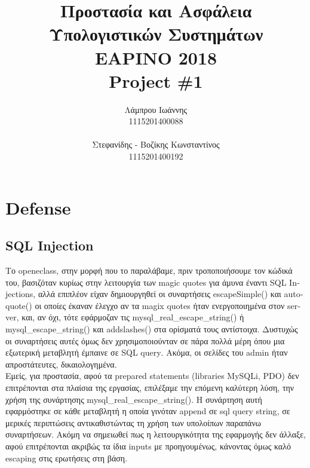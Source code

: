 \documentclass{article}
\begin{document}
\title{\vspace{-3.5cm}\textbf{Προστασία και Ασφάλεια Υπολογιστικών Συστημάτων \\ΕΑΡΙΝΟ 2018\\ \textlatin{Project \#}1}}
\author{Λάμπρου Ιωάννης \\1115201400088\\\\ Στεφανίδης - Βοζίκης Κωνσταντίνος \\1115201400192}

\maketitle
\section*{\textlatin{Defense}}
\subsection*{\textlatin{SQL Injection}}
Το \textlatin{openeclass}, στην μορφή που το παραλάβαμε, πριν τροποποιήσουμε τον κώδικά του, 
βασιζόταν κυρίως στην λειτουργία των \textlatin{magic quotes} για άμυνα έναντι \textlatin{SQL Injections},
αλλά επιπλέον είχαν δημιουργηθεί οι συναρτήσεις \textlatin{escapeSimple()} και \textlatin{autoquote()} οι
οποίες έκαναν έλεγχο αν τα \textlatin{magix quotes} ήταν ενεργοποιημένα στον \textlatin{server}, και, αν
όχι, τότε εφάρμοζαν τις \textlatin{mysql\_real\_escape\_string()} ή \textlatin{mysql\_escape\_string()} και
\textlatin{addslashes()} στα ορίσματά τους αντίστοιχα. Δυστυχώς οι συναρτήσεις αυτές όμως δεν
χρησιμοποιούνταν σε πάρα πολλά μέρη όπου μια εξωτερική μεταβλητή
έμπαινε σε \textlatin{SQL query}. Ακόμα, οι σελίδες του \textlatin{admin} ήταν απροστάτευτες, δικαιολογημένα.\\
Εμείς, για προστασία, αφού τα \textlatin{prepared statements (libraries MySQLi, PDO)} δεν επιτρέπονται στα
πλαίσια της εργασίας, επιλέξαμε την επόμενη καλύτερη λύση, την χρήση της συνάρτησης
\textlatin{mysql\_real\_escape\_string()}.
Η συνάρτηση αυτή εφαρμόστηκε σε κάθε μεταβλητή η οποία γινόταν \textlatin{append}
σε \textlatin{sql query string}, σε μερικές περιπτώσεις αντικαθιστώντας τη χρήση των υπολοίπων παραπάνω
συναρτήσεων. Ακόμη να σημειωθεί πως η λειτουργικότητα της εφαρμογής δεν άλλαξε, αφού επιτρέπονται ακριβώς τα ίδια \textlatin{inputs} με προηγουμένως, κάνοντας όμως καλό \textlatin{escaping} στις ερωτήσεις στη βάση.
\end{document}
